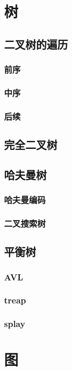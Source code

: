 \documentclass[12pt,twiside,a4paper]{ctexbook}
\numberwithin{chapter}{part}
\begin{document}
\chapter{树}
\section{二叉树的遍历}
\subsection{前序}
\subsection{中序}
\subsection{后续}

\section{完全二叉树}
\section{哈夫曼树}
\subsection{哈夫曼编码}
\subsection{二叉搜索树}

\section{平衡树}
\subsection{AVL}
\subsection{treap}
\subsection{splay}

\chapter{图}
\end{document}
